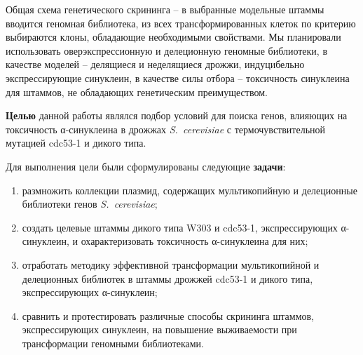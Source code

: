 Общая схема генетического скрининга -- в выбранные модельные штаммы вводится геномная библиотека, из всех трансформированных клеток по критерию выбираются клоны, обладающие необходимыми свойствами. Мы планировали использовать оверэкспрессионную и делеционную геномные библиотеки, в качестве моделей -- делящиеся и неделящиеся дрожжи, индуцибельно экспрессирующие синуклеин, в качестве силы отбора -- токсичность синуклеина для штаммов, не обладающих генетическим преимуществом.

\textbf{Целью} данной работы являлся подбор условий для поиска генов, влияющих на токсичность α-синуклеина в дрожжах \emph{S.~cerevisiae} с термочувствительной мутацией cdc53-1 и дикого типа.

Для выполнения цели были сформулированы следующие \textbf{задачи}:
\begin{enumerate}

\item размножить коллекции плазмид, содержащих мультикопийную и делеционные библиотеки генов \emph{S.~cerevisiae};

\item создать целевые штаммы дикого типа W303 и cdc53-1, экспрессирующих α-синуклеин, и охарактеризовать токсичность α-синуклеина для них;

\item отработать методику эффективной трансформации мультикопийной и делеционных библиотек в штаммы дрожжей cdc53-1 и дикого типа, экспрессирующих α-синуклеин;

\item сравнить и протестировать различные способы скрининга штаммов, экспрессирующих синуклеин, на повышение выживаемости при трансформации геномными библиотеками.
\end{enumerate}